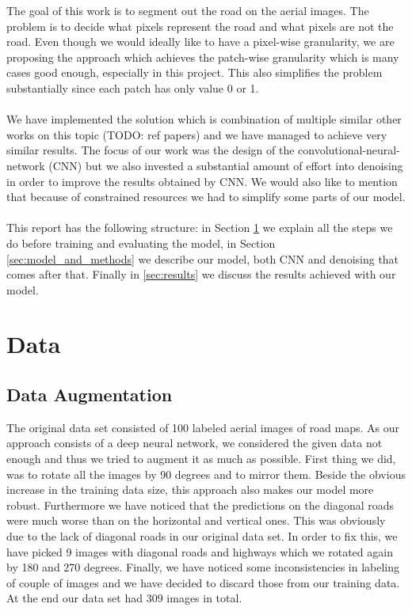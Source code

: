 \documentclass[10pt,conference,compsocconf]{IEEEtran}
\begin{document}
The goal of this work is to segment out the road on the aerial images. The problem is to decide what pixels
represent the road and what pixels are not the road. Even though we would ideally like to have a pixel-wise
granularity, we are proposing the approach which achieves the patch-wise granularity which is many cases good enough,
especially in this project. This also simplifies the problem substantially since each patch has only value 0 or 1. \\
\\
We have implemented the solution which is combination of multiple similar other works on this topic (TODO: ref papers) 
and we have managed to achieve very similar results. The focus of our work was the design of the
convolutional-neural-network (CNN) but we also invested a substantial amount of effort into denoising in order
to improve the results obtained by CNN. We would also like to mention that because of constrained resources
we had to simplify some parts of our model.\\
\\
This report has the following structure: in Section \ref{sec:Data} we explain all the steps we do before training
and evaluating the model, in Section \ref{sec:model_and_methods} we describe our model, both CNN and denoising
that comes after that. Finally in \ref{sec:results} we discuss the results achieved with our model.


\section{Data}
\label{sec:Data}

\subsection{Data Augmentation}
\label{sec:data_aug}
The original data set consisted of 100 labeled aerial images of road maps. As our approach consists of a
deep neural network, we considered the given data not enough and thus we tried to augment it as much as possible.
First thing we did, was to rotate all the images by 90 degrees and to mirror them. Beside the obvious increase
in the training data size, this approach also makes our model more robust. Furthermore we have noticed that the 
predictions on the diagonal roads were much worse than on the horizontal and vertical ones. This was obviously due to
the lack of diagonal roads in our original data set. In order to fix this, we have picked 9 images with diagonal
roads and highways which we rotated again by 180 and 270 degrees. Finally, we have noticed some inconsistencies
in labeling of couple of images and we have decided to discard those from our training data. At the end our data set
had 309 images in total.
\end{document}
